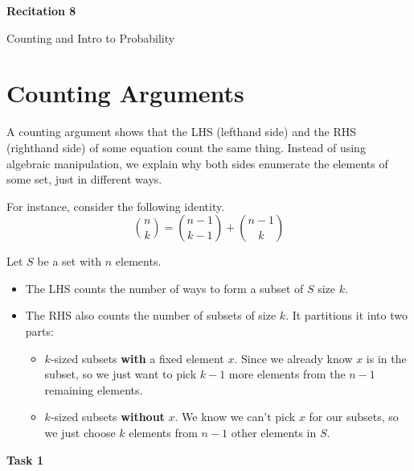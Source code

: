 \documentclass[12pt,letterpaper]{article}
\begin{document}
  \thispagestyle{firstpagestyle}
  \begin{center}
    {\large \textbf{Recitation 8}}
    
    {\large Counting and Intro to Probability}

  \end{center}
  
	\section*{Counting Arguments}
	
	A counting argument shows that the LHS (lefthand side) and the RHS (righthand side) of some equation count the same thing. Instead of using algebraic manipulation, we explain why both sides enumerate the elements of some set, just in different ways.
	
	
	For instance, consider the following identity.
    $$\binom{n}{k} = \binom{n-1}{k-1} + \binom{n-1}{k}$$
    
    Let $S$ be a set with $n$ elements.
    
    \begin{itemize}
        \item The LHS counts the number of ways to form a subset of $S$ size $k$.
        \item The RHS also counts the number of subsets of size $k$. It partitions it into two parts:
        \begin{itemize}
            \item $k$-sized subsets \textbf{with} a fixed element $x$. Since we already know $x$ is in the subset, so we just want to pick $k-1$ more elements from the $n-1$ remaining elements.
            \item $k$-sized subsets \textbf{without} $x$. We know we can't pick $x$ for our subsets, so we just choose $k$ elements from $n-1$ other elements in $S$.
        \end{itemize}
    \end{itemize}
    
	
	\textbf{Task 1}
	
\end{document}
